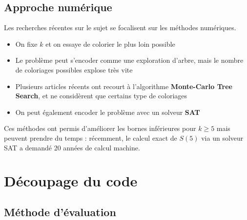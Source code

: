 \documentclass[graphics]{beamer}
\begin{document}
\subsection{Approche numérique}

\begin{frame}
	Les recherches récentes sur le sujet se focalisent sur les méthodes numériques.
	\begin{itemize}
		\item On fixe \(k\) et on essaye de colorier le plus loin possible
		\item Le problème peut s'encoder comme une exploration d'arbre, mais le nombre de coloriages possibles
		explose très vite 
		\item Plusieurs articles récents ont recourt à l'algorithme \textbf{Monte-Carlo Tree Search}, et ne considèrent 
		que certains type de coloriages
		\item On peut également encoder le problème avec un solveur \textbf{SAT} 
	\end{itemize}
	\pause
	Ces méthodes ont permis d'améliorer les bornes inférieures pour \(k \geq 5\) mais peuvent prendre du temps :
	récemment, le calcul exact de \(S(5)\) via un solveur SAT a demandé 20 années de calcul machine.
\end{frame}

\section{Découpage du code}

\subsection{Méthode d'évaluation}
\end{document}
